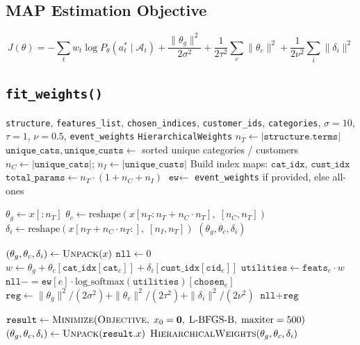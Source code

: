 \documentclass[11pt,a4paper]{article}
\begin{document}
\subsection{MAP Estimation Objective}

\[
J(\theta) = -\sum_t w_t \log P_\theta(a^*_t \mid \mathcal{A}_t) + \frac{\|\theta_g\|^2}{2\sigma^2} + \frac{1}{2\tau^2}\sum_c \|\theta_c\|^2 + \frac{1}{2\nu^2}\sum_i \|\delta_i\|^2
\]

\subsection{\texttt{fit\_weights()}}

\begin{algorithm}[H]
\caption{\textsc{FitWeights}}\label{alg:fit-weights}
\begin{algorithmic}[1]
\Require \texttt{structure}, \texttt{features\_list}, \texttt{chosen\_indices}, \texttt{customer\_ids}, \texttt{categories}, $\sigma{=}10$, $\tau{=}1$, $\nu{=}0.5$, \texttt{event\_weights}
\Ensure \texttt{HierarchicalWeights}
\State $n_T \gets |\texttt{structure.terms}|$
\State $\texttt{unique\_cats}, \texttt{unique\_custs} \gets$ sorted unique categories / customers
\State $n_C \gets |\texttt{unique\_cats}|$; \; $n_I \gets |\texttt{unique\_custs}|$
\State Build index maps: $\texttt{cat\_idx}$, $\texttt{cust\_idx}$
\State $\texttt{total\_params} \gets n_T \cdot (1 + n_C + n_I)$
\State $\texttt{ew} \gets$ \texttt{event\_weights} if provided, else all-ones

\Statex
{}
    \State $\theta_g \gets x[: n_T]$
    \State $\theta_c \gets \text{reshape}(x[n_T : n_T + n_C \cdot n_T],\; [n_C, n_T])$
    \State $\delta_i \gets \text{reshape}(x[n_T + n_C \cdot n_T :],\; [n_I, n_T])$
    \State \Return $(\theta_g, \theta_c, \delta_i)$
\EndFunction

\Statex
{}
    \State $(\theta_g, \theta_c, \delta_i) \gets \Call{Unpack}{x}$
    \State $\texttt{nll} \gets 0$
        \State $w \gets \theta_g + \theta_c[\texttt{cat\_idx}[\texttt{cat}_e]] + \delta_i[\texttt{cust\_idx}[\texttt{cid}_e]]$
        \State $\texttt{utilities} \gets \texttt{feats}_e \cdot w$
        \State $\texttt{nll} \mathrel{{-}{=}} \texttt{ew}[e] \cdot \text{log\_softmax}(\texttt{utilities})[\texttt{chosen}_e]$
    \EndFor
    \State $\texttt{reg} \gets \|\theta_g\|^2 / (2\sigma^2) + \|\theta_c\|^2 / (2\tau^2) + \|\delta_i\|^2 / (2\nu^2)$
    \State \Return $\texttt{nll} + \texttt{reg}$
\EndFunction

\Statex
\State $\texttt{result} \gets \Call{Minimize}{\textsc{Objective},\; x_0 = \mathbf{0},\; \text{L-BFGS-B},\; \text{maxiter}=500}$
\State $(\theta_g, \theta_c, \delta_i) \gets \Call{Unpack}{\texttt{result}.x}$
\State \Return $\textsc{HierarchicalWeights}(\theta_g, \theta_c, \delta_i)$
\end{algorithmic}
\end{algorithm}
\end{document}
